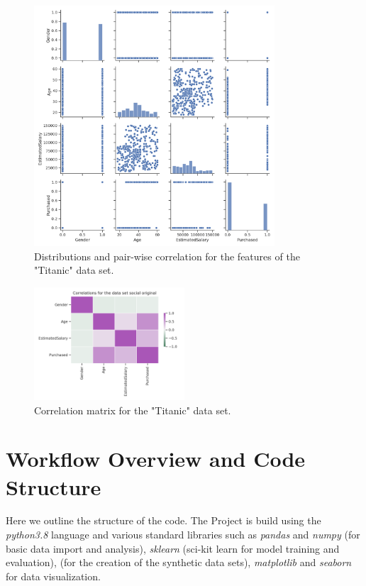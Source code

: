 \documentclass{article}
\begin{document}
\begin{figure}[h!]
	\centering
	\includegraphics[width=0.8\textwidth]{../plots/social_pairplot_original.png}
	\caption{ Distributions and pair-wise correlation for the features of the "Titanic" data set.}
	\label{pairplot_income}
\end{figure}


\begin{figure}[h!]
	\centering
	\includegraphics[width=0.5\textwidth]{../plots/social_correlations_original.png}
	\caption{Correlation matrix for the "Titanic" data set. }
	\label{correlation_income}
\end{figure}


\section{Workflow Overview and Code Structure}
Here we outline the structure of the code. The Project is build using the \textit{python3.8} language and various standard libraries such as \textit{pandas} and \textit{numpy} (for basic data import and analysis), \textit{sklearn} (sci-kit learn for model training and evaluation), \textit{} (for the creation of the synthetic data sets), \textit{matplotlib} and \textit{seaborn} for data visualization.
\end{document}
